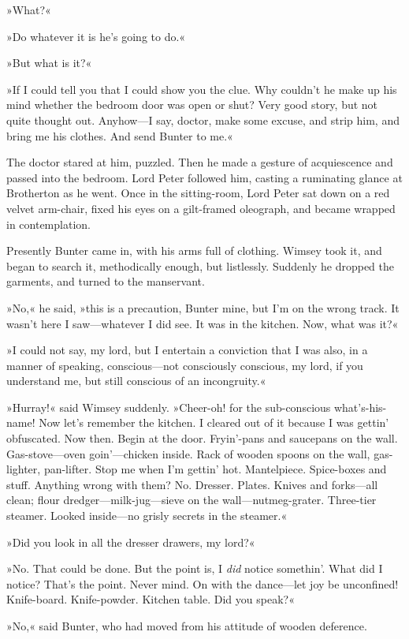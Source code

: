 »What?«

»Do whatever it is he's going to do.«

»But what is it?«

»If I could tell you that I could show you the clue. Why couldn't he make up his mind whether the bedroom door was open or shut? Very good story, but not quite thought out. Anyhow—I say, doctor, make some excuse, and strip him, and bring me his clothes. And send Bunter to me.«

The doctor stared at him, puzzled. Then he made a gesture of acquiescence and passed into the bedroom. Lord Peter followed him, casting a ruminating glance at Brotherton as he went. Once in the sitting-room, Lord Peter sat down on a red velvet arm-chair, fixed his eyes on a gilt-framed oleograph, and became wrapped in contemplation.

Presently Bunter came in, with his arms full of clothing. Wimsey took it, and began to search it, methodically enough, but listlessly. Suddenly he dropped the garments, and turned to the manservant.

»No,« he said, »this is a precaution, Bunter mine, but I'm on the wrong track. It wasn't here I saw—whatever I did see. It was in the kitchen. Now, what was it?«

»I could not say, my lord, but I entertain a conviction that I was also, in a manner of speaking, conscious—not consciously conscious, my lord, if you understand me, but still conscious of an incongruity.«

»Hurray!« said Wimsey suddenly. »Cheer-oh! for the sub-conscious what's-his-name! Now let's remember the kitchen. I cleared out of it because I was gettin' obfuscated. Now then. Begin at the door. Fryin'-pans and saucepans on the wall. Gas-stove—oven goin'—chicken inside. Rack of wooden spoons on the wall, gas-lighter, pan-lifter. Stop me when I'm gettin' hot. Mantelpiece. Spice-boxes and stuff. Anything wrong with them? No. Dresser. Plates. Knives and forks—all clean; flour dredger—milk-jug—sieve on the wall—nutmeg-grater. Three-tier steamer. Looked inside—no grisly secrets in the steamer.«

»Did you look in all the dresser drawers, my lord?«

»No. That could be done. But the point is, I \textit{did} notice somethin'. What did I notice? That's the point. Never mind. On with the dance—let joy be unconfined! Knife-board. Knife-powder. Kitchen table. Did you speak?«

»No,« said Bunter, who had moved from his attitude of wooden deference.

